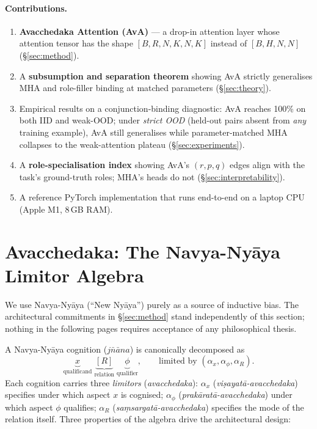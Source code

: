 \documentclass{article}
\begin{document}
\paragraph{Contributions.}
\begin{enumerate}
    \item \textbf{Avacchedaka Attention (AvA)} --- a drop-in attention
      layer whose attention tensor has the shape
      $[B, R, N, K, N, K]$ instead of $[B, H, N, N]$ (\S\ref{sec:method}).
    \item A \textbf{subsumption and separation theorem} showing AvA
      strictly generalises MHA and role-filler binding at matched
      parameters (\S\ref{sec:theory}).
    \item Empirical results on a conjunction-binding diagnostic:
      AvA reaches 100\% on both IID and weak-OOD; under \emph{strict
      OOD} (held-out pairs absent from \emph{any} training example),
      AvA still generalises while parameter-matched MHA collapses to
      the weak-attention plateau (\S\ref{sec:experiments}).
    \item A \textbf{role-specialisation index} showing AvA's
      $(r, p, q)$ edges align with the task's ground-truth roles; MHA's
      heads do not (\S\ref{sec:interpretability}).
    \item A reference PyTorch implementation that runs end-to-end on a
      laptop CPU (Apple M1, 8\,GB RAM).
\end{enumerate}

\section{Avacchedaka: The Navya-Ny\=aya Limitor Algebra}
\label{sec:background}

We use Navya-Ny\=aya (``New Ny\=aya'') purely as a source of
inductive bias. The architectural commitments in \S\ref{sec:method} stand
independently of this section; nothing in the following pages
requires acceptance of any philosophical thesis.

A Navya-Ny\=aya cognition ($j\bar{n}\bar{a}na$) is canonically
decomposed \citep[Ch.~2]{matilal1968navya} as
\begin{equation}
    \underbrace{x}_{\text{qualificand}} \;
    \underbrace{[R]}_{\text{relation}} \;
    \underbrace{\phi}_{\text{qualifier}}, \qquad
    \text{limited by } (\alpha_x, \alpha_\phi, \alpha_R).
    \label{eq:nn-canonical}
\end{equation}
Each cognition carries three \emph{limitors} (\emph{avacchedaka}):
$\alpha_x$ (\emph{vi\d{s}ayat\=a-avacchedaka}) specifies under which
aspect $x$ is cognised; $\alpha_\phi$
(\emph{prak\=arat\=a-avacchedaka}) under which aspect $\phi$ qualifies;
$\alpha_R$ (\emph{sa\d{m}sargat\=a-avacchedaka}) specifies the mode of
the relation itself. Three properties of the algebra drive the
architectural design:
\end{document}
